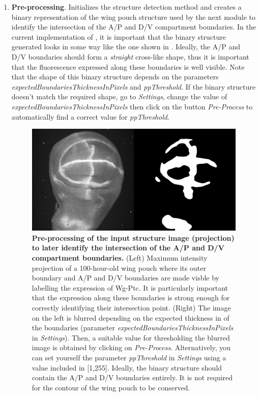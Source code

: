 \begin{enumerate}
 \item \textbf{Pre-processing}. Initializes the structure detection method and creates a binary representation of the wing pouch structure used by the next module to identify the intersection of the A/P and D/V compartment boundaries. In the current implementation of \wingj, it is important that the binary structure generated looks in some way like the one shown in . Ideally, the A/P and D/V boundaries should form a \emph{straight} cross-like shape, thus it is important that the fluorescence expressed along these boundaries is well visible. Note that the shape of this binary structure depends on the parameters \textit{expectedBoundariesThicknessInPixels} and \textit{ppThreshold}. If the binary structure doesn't match the required shape, go to \textit{Settings}, change the value of \textit{expectedBoundariesThicknessInPixels} then click on the button \textit{Pre-Process} to automatically find a correct value for \textit{ppThreshold}.

\begin{figure}[!h]
\centering
\includegraphics[scale=0.40]{images/pp_binary_structure.jpg}
\caption{\textbf{Pre-processing of the input structure image (projection) to later identify the intersection of the A/P and D/V compartment boundaries.} (Left) Maximum intensity projection of a 100-hour-old \droso wing pouch where its outer boundary and A/P and D/V boundaries are made visble by labelling the expression of Wg-Ptc. It is particularly important that the expression along these boundaries is strong enough for correctly identifying their intersection point. (Right) The image on the left is blurred depending on the expected thickness in \px of the boundaries (parameter \textit{expectedBoundariesThicknessInPixels} in \textit{Settings}). Then, a suitable value for thresholding the blurred image is obtained by clicking on \textit{Pre-Process}. Alternatively, you can set yourself the parameter \textit{ppThreshold} in \textit{Settings} using a value included in [1,255]. Ideally, the binary structure should contain the A/P and D/V boundaries entirely. It is not required for the contour of the wing pouch to be conserved.}
\label{fig:pp_binary_structure}
\end{figure}


\end{enumerate}
